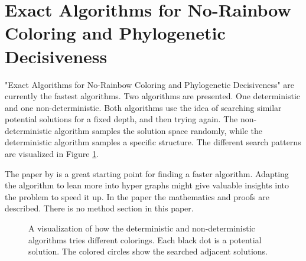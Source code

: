 \documentclass[msc,lith,english]{liuthesis}
\begin{document}
\section{Exact Algorithms for No-Rainbow Coloring and Phylogenetic Decisiveness}
"Exact Algorithms for No-Rainbow Coloring and Phylogenetic Decisiveness" \cite{sourceNoRainbow}
are currently the fastest algorithms.
Two algorithms are presented. One deterministic and one non-deterministic. Both
algorithms use the idea of searching similar potential solutions for a fixed
depth, and then trying again. The non-deterministic algorithm samples the
solution space randomly, while the deterministic algorithm samples a specific
structure. The different search patterns are visualized in Figure \ref{figNoRainbowSearchPattern}. 

The paper by \citeauthor{sourceNoRainbow} \cite{sourceNoRainbow} is a great starting point for finding a faster algorithm.
Adapting the algorithm to lean more into hyper graphs might give valuable insights into the problem to speed it up.
In the paper the mathematics and proofs are described. There is no method section in this paper.

\begin{center}
\begin{figure}[h]
\centering
{}
  \caption{A visualization of how the deterministic and non-deterministic algorithms tries different colorings. Each black dot is a potential solution. The colored circles show the searched adjacent solutions.}
  \label{figNoRainbowSearchPattern}
\end{figure}
\end{center}
\end{document}
